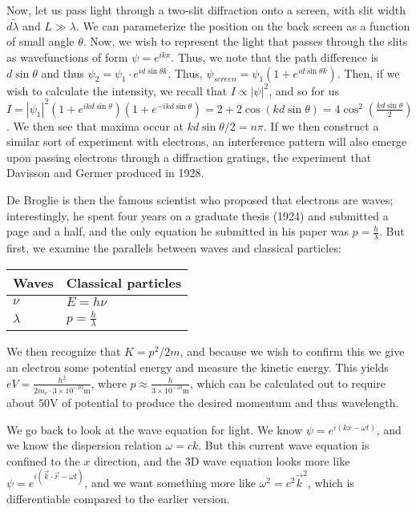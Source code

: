 \documentclass{report}
\begin{document}
Now, let us pass light through a two-slit diffraction onto a screen, with slit width $d \tilde \lambda$ and $L \gg \lambda$. We can parameterize the position on the back screen as a function of small angle $\theta$. Now, we wish to represent the light that passes through the slits as wavefunctions of form $\psi = e^{ikx}$. Thus, we note that the path difference is $d\sin\theta$ and thus $\psi_2 = \psi_1\cdot e^{id\sin\theta k}$. Thus, $\psi_{screen} = \psi_1(1 + e^{id\sin\theta k})$. Then, if we wish to calculate the intensity, we recall that $I \propto |\psi|^2$, and so for us $I = |\psi_1|^2 (1+e^{ikd\sin\theta})(1 + e^{-ikd\sin\theta}) = 2+2\cos(kd\sin\theta) = 4\cos^2\left(\frac{kd\sin\theta}{2}\right)$. We then see that maxima occur at $kd\sin\theta/2 = n\pi$. If we then construct a similar sort of experiment with electrons, an interference pattern will also emerge upon passing electrons through a diffraction gratings, the experiment that Davisson and Germer produced in 1928. 

De Broglie is then the famous scientist who proposed that electrons are waves; interestingly, he spent four years on a graduate thesis (1924) and submitted a page and a half, and the only equation he submitted in his paper was $p = \frac{h}{\lambda}$. But first, we examine the parallels between waves and classical particles:

\begin{center}
\begin{tabular}{l|l}
Waves & Classical particles\\\hline
$\nu$ & $E = h\nu$\\
$\lambda$ & $p = \frac{h}{\lambda}$\\
\end{tabular}
\end{center}

We then recognize that $K = p^2/2m$, and because we wish to confirm this we give an electron some potential energy and measure the kinetic energy. This yields $eV = \frac{h^2}{2m_e\cdot 3\times 10^{-10}\mathrm{m}}$, where $p \approx \frac{h}{3 \times 10^{-10}\mathrm{m}}$, which can be calculated out to require about $50$V of potential to produce the desired momentum and thus wavelength. 

We go back to look at the wave equation for light. We know $\psi = e^{i(kx - \omega t)}$, and we know the dispersion relation $\omega = ck$. But this current wave equation is confined to the $x$ direction, and the 3D wave equation looks more like $\psi = e^{i(\vec{k}\cdot\vec{r} - \omega t)}$, and we want something more like $\omega^2 = c^2\vec{k}^2$, which is differentiable compared to the earlier version.
\end{document}
